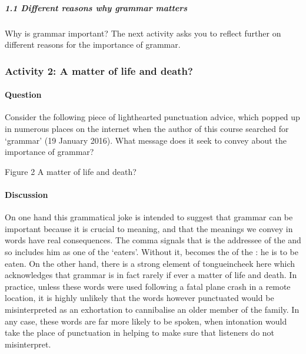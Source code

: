 \documentclass[letterpaper,10pt,english]{sphinxmanual}
\let\sphinxpxdimen\pdfpxdimen\else\newdimen\sphinxpxdimen
\begin{document}
\subparagraph{1.1 Different reasons why grammar matters}
\label{\detokenize{content/session_00/Part_00_01:1.1-Different-reasons-why-grammar-matters}}
Why is grammar important? The next activity asks you to reflect further on different reasons for the importance of grammar.


\subsubsection{Activity 2: A matter of life and death?}
\label{\detokenize{content/session_00/Part_00_01:Activity-2:-A-matter-of-life-and-death?}}


\paragraph{Question}
\label{\detokenize{content/session_00/Part_00_01:id1}}
Consider the following piece of light\sphinxhyphen{}hearted punctuation advice, which popped up in numerous places on the internet when the author of this course searched for ‘grammar’ (19 January 2016). What message does it seek to convey about the importance of grammar?

\sphinxincludegraphics[width=342\sphinxpxdimen,height=187\sphinxpxdimen]{{e304_bk1_ch1_fig003}.jpg}

Figure 2 A matter of life and death?


\paragraph{Discussion}
\label{\detokenize{content/session_00/Part_00_01:id2}}
On one hand this grammatical joke is intended to suggest that grammar can be important because it is crucial to meaning, and that the meanings we convey in words have real consequences. The comma signals that  is the addressee of the and so includes him as one of the ‘eaters’. Without it,  becomes the  of the : he is to be eaten. On the other hand, there is a strong element of tongue\sphinxhyphen{}in\sphinxhyphen{}cheek here which acknowledges that
grammar is in fact rarely \textendash{} if ever \textendash{} a matter of life and death. In practice, unless these words were used following a fatal plane crash in a remote location, it is highly unlikely that the words  \textendash{} however punctuated \textendash{} would be misinterpreted as an exhortation to cannibalise an older member of the family. In any case, these words are far more likely to be spoken, when intonation would take the place of punctuation in helping to make sure that listeners do not misinterpret.
\end{document}
